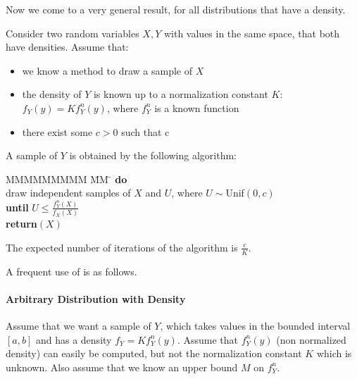Now we come to a very general result, for all distributions that
have a density.
\begin{shadethm}
Consider two random variables $X, Y$ with values
in the same space, that both have densities. Assume that:
\begin{itemize}
    \item we know a method to draw a sample of $X$
    \item the density of $Y$ is known up to a normalization
    constant $K$: $f_Y(y)=K f_Y^n(y)$, where $f_Y^n$ is a known
    function
    \item there exist some $c>0$ such that
 \ben
  \leq c
 \een
\end{itemize}

A sample of $Y$ is obtained by the following algorithm:
\begin{tabbing}
  MMMMMMMMM \= MM \=  \kill
  \>\textbf{do}  \\
  \>  \> draw independent samples of  $X$ and $U$, where $U\sim$Unif$(0,c)$ \\
  \>\textbf{until} $U \leq \frac{f_Y^n(X)}{f_X(X)}$ \\
  \>\textbf{return}$(X)$
\end{tabbing}

The expected number of iterations of the algorithm is
$\frac{c}{K}$.
\end{shadethm}

A frequent use of  is as follows.
\paragraph{Arbitrary Distribution with Density}
Assume that we want a sample of $Y$, which takes values in the
bounded interval $[a,b]$ and has a density $f_Y=K f_Y^n(y)$. Assume that $f_Y^n(y)$ (non normalized density)
can easily be computed, but not the normalization constant $K$
which is unknown. Also assume that we know an upper bound $M$ on
$f_Y^n$.

